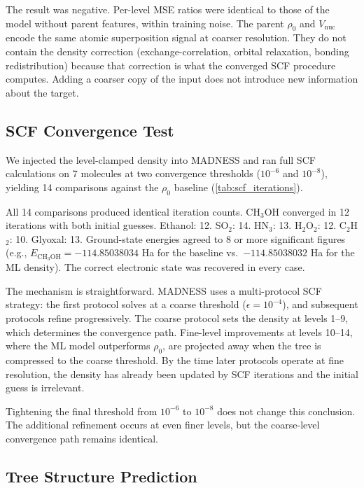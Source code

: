 The result was negative. Per-level MSE ratios were identical to those
of the model without parent features, within training noise. The parent
$\rho_0$ and $V_\text{nuc}$ encode the same atomic superposition signal
at coarser resolution. They do not contain the density correction
(exchange-correlation, orbital relaxation, bonding redistribution)
because that correction is what the converged SCF procedure computes.
Adding a coarser copy of the input does not introduce new information
about the target.

\subsection{SCF Convergence Test}
\label{sec:scf_test}

We injected the level-clamped density into MADNESS and ran full SCF
calculations on 7 molecules at two convergence thresholds ($10^{-6}$
and $10^{-8}$), yielding 14 comparisons against the $\rho_0$ baseline
(\autoref{tab:scf_iterations}).



All 14 comparisons produced identical iteration counts. CH$_3$OH
converged in 12 iterations with both initial guesses. Ethanol: 12.
SO$_2$: 14. HN$_3$: 13. H$_2$O$_2$: 12. C$_2$H$_2$: 10.
Glyoxal: 13. Ground-state energies agreed to 8 or more significant
figures (e.g., $E_{\text{CH}_3\text{OH}} = -114.85038034$ Ha for the
baseline vs.\ $-114.85038032$ Ha for the ML density). The correct
electronic state was recovered in every case.

The mechanism is straightforward. MADNESS uses a multi-protocol SCF
strategy: the first protocol solves at a coarse threshold
($\epsilon = 10^{-4}$), and subsequent protocols refine progressively.
The coarse protocol sets the density at levels 1--9, which determines
the convergence path. Fine-level improvements at levels 10--14, where
the ML model outperforms $\rho_0$, are projected away when the tree is
compressed to the coarse threshold. By the time later protocols operate
at fine resolution, the density has already been updated by SCF
iterations and the initial guess is irrelevant.

Tightening the final threshold from $10^{-6}$ to $10^{-8}$ does not
change this conclusion. The additional refinement occurs at even finer
levels, but the coarse-level convergence path remains identical.

\subsection{Tree Structure Prediction}
\label{sec:tree_prediction}

